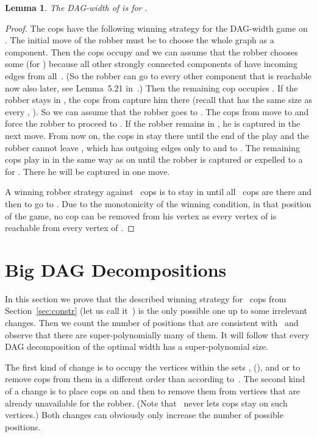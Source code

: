 \documentclass[authoryear]{article}
\newtheorem{lemma}[theorem]{Lemma}
\theoremstyle{definition}
\newcommand{\0}{\emptyset}
\newcommand{\dagw}{DAG-{}width\xspace}
\begin{document}
\begin{lemma}
  \label{lemma:dagw}
The \dagw of  is  for .
\end{lemma}
\begin{proof}
  The  cops have the following winning strategy for the \dagw game on
  . The initial move of the robber must be to choose the whole graph
  as a component. Then the cops occupy  and we can assume that the
  robber chooses some  (for ) because
  all other strongly connected components of  have
  incoming edges from all~. (So the robber can go to every
  other component that is reachable now also later, see Lemma~5.21
  in~\cite{RabinovichPhD}.)  Then the remaining cop occupies
  . If the robber stays in , the cops from 
  capture him there (recall that  has the same size  as
  every , ). So we can assume that
  the robber goes to . 
  The cops from  move to  and
  force the robber to proceed to . If the robber
  remains in , he is captured in the next move. From now on,
  the  cops in  stay there until the end
  of the play and the robber cannot leave , which has
  outgoing edges only to  and to . The remaining  cops play in
   in the same way as on  until the
  robber is captured or expelled to a  for . There he
  will be captured in one move.

  A winning robber strategy against~ cops is to stay in 
  until all~ cops are there and then to go to . Due to
  the monotonicity of the winning condition, in that
  position of the game, no cop can be removed from his vertex as every
  vertex of  is reachable from every vertex of .
\end{proof}


\section{Big DAG Decompositions}\label{sec:bigdec}

In this section we prove that the described winning strategy for~
cops from Section~\ref{sec:constr}
(let
us call it~) is the only possible one up to some irrelevant
changes. Then we count the number of positions that are consistent
with~ and observe that there are super-polynomially many of
them. It will follow that every DAG decomposition of the optimal width
has a super-polynomial size.

The first kind of change is to occupy the vertices within the sets
,  (),  and  or
to remove cops from them in
a different order than according to~. The second kind of a change is to
place cops on and then to remove them from vertices that are already
unavailable for the robber. (Note that~ never lets cops stay
on such vertices.) Both changes can obviously only increase the number of
possible positions.
\end{document}
